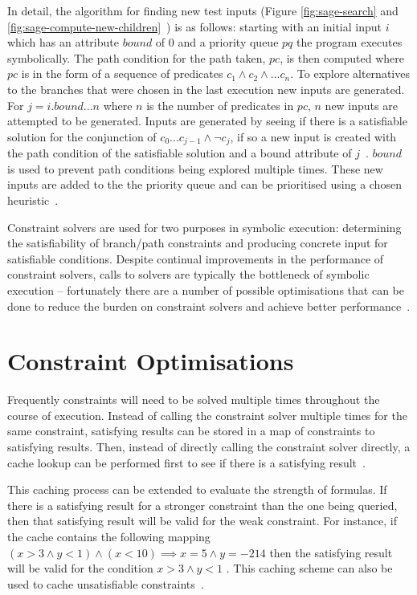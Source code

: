 \documentclass[]{final_report}
\begin{document}
In detail, the algorithm for finding new test inputs (Figure \ref{fig:sage-search} and \ref{fig:sage-compute-new-children}~\cite{godefroid2008automated}) is as follows: starting with an initial input $i$ which has an attribute $bound$ of 0 and a priority queue $pq$ the program executes symbolically. The path condition for the path taken, $pc$, is then computed where $pc$ is in the form of a sequence of predicates $c_1 \land c_2 \land ... c_n $. To explore alternatives to the branches that were chosen in the last execution new inputs are generated.  For $j = i.bound ... n$ where $n$ is the number of predicates in $pc$, $n$ new inputs are attempted to be generated. Inputs are generated by seeing if there is a satisfiable solution for the conjunction of $c_0...c_{j-1} \land \lnot{c_j}$, if so a new input is created with the path condition of the satisfiable solution and a bound attribute of $j$~\cite{godefroid2005dart, godefroid2008grammar}. $bound$ is used to prevent path conditions being explored multiple times. These new inputs are added to the the priority queue and can be prioritised using a chosen heuristic~\cite{cadar2013symbolic}.

Constraint solvers are used for two purposes in symbolic execution: determining the satisfiability of branch/path constraints and producing concrete input for satisfiable conditions. Despite continual improvements in the performance of constraint solvers, calls to solvers are typically the bottleneck of symbolic execution -- fortunately there are a number of possible optimisations that can be done to reduce the burden on constraint solvers and achieve better performance~\cite{cadar2013symbolic}.

\section{Constraint Optimisations}
Frequently constraints will need to be solved multiple times throughout the course of execution. Instead of calling the constraint solver multiple times for the same constraint, satisfying results can be stored in a map of constraints to satisfying results. Then, instead of directly calling the constraint solver directly, a cache lookup can be performed first to see if there is a satisfying result~\cite{cadar2008klee}.

This caching process can be extended to evaluate the strength of formulas. If there is a satisfying result for a stronger constraint than the one being queried, then that satisfying result will be valid for the weak constraint. For instance, if the cache contains the following mapping $ (x > 3 \land y <1) \land (x < 10) \implies x = 5 \land y = -214$ then the satisfying result will be valid for the condition $x > 3 \land y < 1 $ . This caching scheme can also be used to cache unsatisfiable constraints~\cite{cadar2008klee}.
\end{document}
